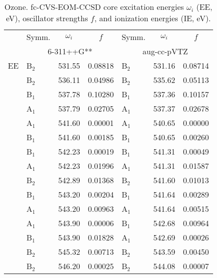 \documentclass[journal=jctcce,manuscript=article]{achemso}
\begin{document}
\begin{table}
\caption{Ozone. fc-CVS-EOM-CCSD core excitation energies $\omega_i$ (EE, eV), oscillator strengths $f$, and ionization energies (IE, eV). \label{Tab:Ozone}}
\scriptsize
\begin{tabular}{l|lcc|lcc}
\cline{2-7}
& Symm. & $\omega_i$ & $f$ & Symm. & $\omega_i$ & $f$ \\
 \cline{2-7}
 & \multicolumn{3}{c|}{6-311++G**}
 & \multicolumn{3}{c}{aug-cc-pVTZ} \\
\hline
  EE 
& B$_2$ & 531.55 & 0.08818      & B$_2$ & 531.16 & 0.08714 \\
& B$_2$ & 536.11 & 0.04986      & B$_2$ & 535.62 & 0.05113 \\
& B$_1$ & 537.78 & 0.10280      & B$_1$ & 537.36 & 0.10157 \\
& A$_1$ & 537.79 & 0.02705      & A$_1$ & 537.37 & 0.02678 \\
& A$_1$ & 541.60 & 0.00001      & A$_1$ & 540.65 & 0.00000 \\
& B$_1$ & 541.60 & 0.00185      & B$_1$ & 540.65 & 0.00260 \\
& B$_1$ & 542.23 & 0.00019      & B$_1$ & 541.31 & 0.00049 \\
& A$_1$ & 542.23 & 0.01996      & A$_1$ & 541.31 & 0.01587 \\
& B$_2$ & 542.89 & 0.01368      & B$_2$ & 541.60 & 0.01013 \\
& B$_1$ & 543.20 & 0.00204      & B$_1$ & 541.64 & 0.00289 \\
& A$_1$ & 543.20 & 0.00963      & A$_1$ & 541.64 & 0.00515 \\
& A$_1$ & 543.90 & 0.00006      & B$_1$ & 542.68 & 0.00964 \\
& B$_1$ & 543.90 & 0.01828      & A$_1$ & 542.69 & 0.00026 \\
& B$_2$ & 545.32 & 0.00713      & B$_2$ & 543.59 & 0.00450 \\
& B$_2$ & 546.20 & 0.00025      & B$_2$ & 544.08 & 0.00007 \\
\hline
  \end{tabular}
\end{table}
\end{document}
